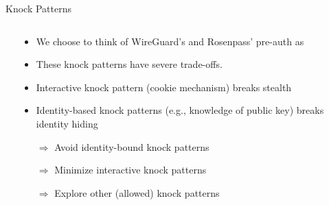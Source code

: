 \begin{frame}{Knock Patterns}
\begin{columns}[fullwidth,c]
    \begin{column}{.45\linewidth}
    \end{column}%
    \begin{column}{.5\linewidth}
      \begin{itemize}
        \item We choose to think of WireGuard's and Rosenpass' pre-auth as 
        \item These knock patterns have severe trade-offs.
        \item Interactive knock pattern (cookie mechanism) breaks stealth
        \item Identity-based knock patterns (e.g., knowledge of public key) breaks identity hiding
        \vspace{0.5em}
        \item[$\Rightarrow$] Avoid identity-bound knock patterns
        \item[$\Rightarrow$] Minimize interactive knock patterns
        \item[$\Rightarrow$] Explore other (allowed) knock patterns
      \end{itemize}
    \end{column}
  \end{columns}
\end{frame}


